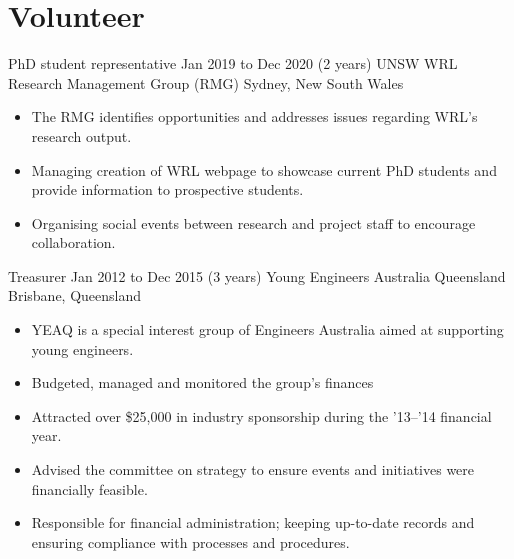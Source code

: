 
\section{Volunteer}


\entrytable%
{PhD student representative}
{Jan 2019 to Dec 2020}
{(2 years)}
{UNSW WRL Research Management Group (RMG)}
{Sydney, New South Wales}
{\begin{itemize}
\item The RMG identifies opportunities and addresses issues regarding WRL's research output.
\item Managing creation of WRL webpage to showcase current PhD students and provide information to prospective students.
\item Organising social events between research and project staff to encourage collaboration.
	\end{itemize}
}

\entrytable%
{Treasurer}
{Jan 2012 to Dec 2015}
{(3 years)}
{Young Engineers Australia Queensland}
{Brisbane, Queensland}
{\begin{itemize}
\item YEAQ is a special interest group of Engineers Australia aimed at supporting young engineers.
\item Budgeted, managed and monitored the group's finances
\item Attracted over \$25,000 in industry sponsorship during the '13--'14 financial year.
\item Advised the committee on strategy to ensure events and initiatives were financially feasible.
\item Responsible for financial administration; keeping up-to-date records and ensuring compliance with processes and procedures.
	\end{itemize}
}




